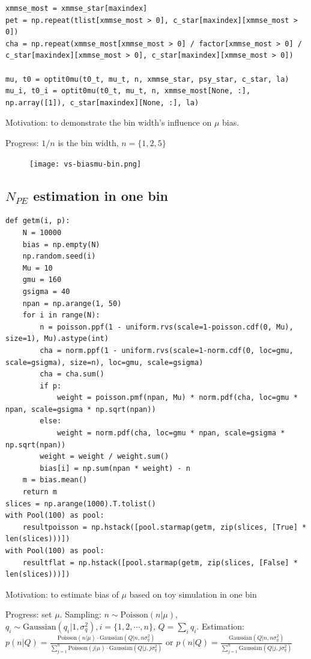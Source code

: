 \documentclass[notitlepage]{article}
\begin{document}
\begin{lstlisting}
xmmse_most = xmmse_star[maxindex]
pet = np.repeat(tlist[xmmse_most > 0], c_star[maxindex][xmmse_most > 0])
cha = np.repeat(xmmse_most[xmmse_most > 0] / factor[xmmse_most > 0] / c_star[maxindex][xmmse_most > 0], c_star[maxindex][xmmse_most > 0])

mu, t0 = optit0mu(t0_t, mu_t, n, xmmse_star, psy_star, c_star, la)
mu_i, t0_i = optit0mu(t0_t, mu_t, n, xmmse_most[None, :], np.array([1]), c_star[maxindex][None, :], la)
\end{lstlisting}

Motivation: to demonstrate the bin width's influence on $\mu$ bias. 

Progress: $1/n$ is the bin width, $n=\{1,2,5\}$

\begin{figure}[H]
    \texttt{[image: vs-biasmu-bin.png]}
\end{figure}

\subsection{$N_{PE}$ estimation in one bin}

\begin{lstlisting}
def getm(i, p):
    N = 10000
    bias = np.empty(N)
    np.random.seed(i)
    Mu = 10
    gmu = 160
    gsigma = 40
    npan = np.arange(1, 50)
    for i in range(N):
        n = poisson.ppf(1 - uniform.rvs(scale=1-poisson.cdf(0, Mu), size=1), Mu).astype(int)
        cha = norm.ppf(1 - uniform.rvs(scale=1-norm.cdf(0, loc=gmu, scale=gsigma), size=n), loc=gmu, scale=gsigma)
        cha = cha.sum()
        if p:
            weight = poisson.pmf(npan, Mu) * norm.pdf(cha, loc=gmu * npan, scale=gsigma * np.sqrt(npan))
        else:
            weight = norm.pdf(cha, loc=gmu * npan, scale=gsigma * np.sqrt(npan))
        weight = weight / weight.sum()
        bias[i] = np.sum(npan * weight) - n
    m = bias.mean()
    return m
slices = np.arange(1000).T.tolist()
with Pool(100) as pool:
    resultpoisson = np.hstack([pool.starmap(getm, zip(slices, [True] * len(slices)))])
with Pool(100) as pool:
    resultflat = np.hstack([pool.starmap(getm, zip(slices, [False] * len(slices)))])
\end{lstlisting}

Motivation: to estimate bias of $\mu$ based on toy simulation in one bin

Progress: set $\mu$. Sampling: $n\sim\mathrm{Poisson}(n|\mu)$, $q_i\sim\mathrm{Gaussian}(q_i|1,\sigma_q^2),i=\{1,2,\cdots,n\}$, $Q=\sum_i q_i$. Estimation: $p(n|Q) = \frac{\mathrm{Poisson}(n|\mu) \cdot \mathrm{Gaussian}(Q|n,n\sigma_q^2)}{\sum_{j=1}^n \mathrm{Poisson}(j|\mu) \cdot \mathrm{Gaussian}(Q|j,j\sigma_q^2)}$ or $p(n|Q) = \frac{\mathrm{Gaussian}(Q|n,n\sigma_q^2)}{\sum_{j=1}^n \mathrm{Gaussian}(Q|j,j\sigma_q^2)}$
\end{document}
